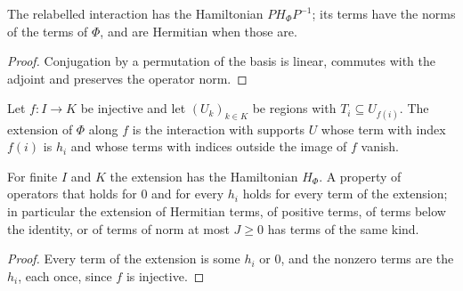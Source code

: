 \begin{lemma}
    \label{lem:dynamics_interaction_relabel}
    \leanok
    The relabelled interaction has the Hamiltonian $PH_\Phi P^{-1}$; its terms have
    the norms of the terms of $\Phi$, and are Hermitian when those are.
\end{lemma}
\begin{proof}
    \leanok
    Conjugation by a permutation of the basis is linear, commutes with the adjoint and
    preserves the operator norm.
\end{proof}

\begin{definition}
    \label{def:dynamics_interaction_extend}
    \leanok
    Let $f\colon I\to K$ be injective and let $(U_k)_{k\in K}$ be regions with
    $T_i\subseteq U_{f(i)}$. The extension of $\Phi$ along $f$ is the interaction with
    supports $U$ whose term with index $f(i)$ is $h_i$ and whose terms with indices
    outside the image of $f$ vanish.
\end{definition}

\begin{lemma}
    \label{lem:dynamics_interaction_extend}
    \leanok
    For finite $I$ and $K$ the extension has the Hamiltonian $H_\Phi$. A property of
    operators that holds for $0$ and for every $h_i$ holds for every term of the
    extension; in particular the extension of Hermitian terms, of positive terms, of
    terms below the identity, or of terms of norm at most $J\ge0$ has terms of the same
    kind.
\end{lemma}
\begin{proof}
    \leanok
    Every term of the extension is some $h_i$ or $0$, and the nonzero terms are the
    $h_i$, each once, since $f$ is injective.
\end{proof}

